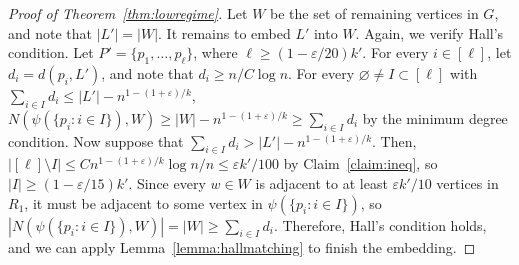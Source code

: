 \documentclass{article}
\theoremstyle{plain}
\theoremstyle{definition}
\numberwithin{equation}{section}
\def\eps{\varepsilon}
\begin{document}
\begin{proof}[Proof of Theorem~\ref{thm:lowregime}]
Let $W$ be the set of remaining vertices in $G$, and note that $|L'|=|W|$. It remains to embed $L'$ into $W$. Again, we verify Hall's condition. Let $P'=\{p_1,\ldots,p_\ell\}$, where $\ell\geq(1-\eps/20)k'$. For every $i\in[\ell]$, let $d_i=d(p_i,L')$, and note that $d_i\geq n/C\log n$. For every $\varnothing\not=I\subset [\ell]$ with $\sum_{i\in I}d_i\leq|L'|-n^{1-(1+\eps)/k}$, $N(\psi(\{p_i:i\in I\}),W)\geq|W|-n^{1-(1+\eps)/k}\geq\sum_{i\in I}d_i$ by the minimum degree condition. Now suppose that $\sum_{i\in I}d_i>|L'|-n^{1-(1+\eps)/k}$. Then, $|[\ell]\setminus I|\leq Cn^{1-(1+\eps)/k}\log n/n\leq\eps k'/100$ by Claim~\ref{claim:ineq}, so $|I|\geq(1-\eps/15)k'$. Since every $w\in W$ is adjacent to at least $\eps k'/10$ vertices in $R_1$, it must be adjacent to some vertex in $\psi(\{p_i:i\in I\})$, so $|N(\psi(\{p_i:i\in I\}),W)|=|W|\geq\sum_{i\in I}d_i$. Therefore, Hall's condition holds, and we can apply Lemma~\ref{lemma:hallmatching} to finish the embedding.  
\end{proof}



\end{document}
